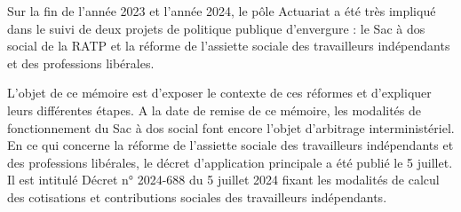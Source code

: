 Sur la fin de l'année 2023 et l'année 2024, le pôle Actuariat a été très impliqué dans le suivi de deux projets de politique publique d'envergure : le Sac à dos social de la RATP et la réforme de l'assiette sociale des travailleurs indépendants et des professions libérales. 

L’objet de ce mémoire est d’exposer le contexte de ces réformes et d’expliquer leurs différentes étapes. A la date de remise de ce mémoire, les modalités de fonctionnement du Sac à dos social font encore l'objet d’arbitrage interministériel.
En ce qui concerne la réforme de l’assiette sociale des travailleurs indépendants et des professions libérales, le décret d'application principale a été publié le 5 juillet. Il est intitulé Décret n° 2024-688 du 5 juillet 2024 fixant les modalités de calcul des cotisations et contributions sociales des travailleurs indépendants.